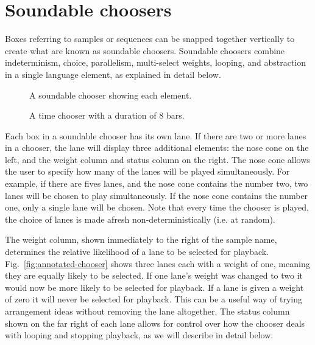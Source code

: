 \documentclass[runningheads,a4paper]{llncs}
\begin{document}
\section{Soundable choosers}\label{choosers}

Boxes referring to samples or sequences can be snapped together vertically to create what are known as soundable choosers. Soundable choosers combine indeterminism, choice, parallelism, multi-select weights, looping, and abstraction in a single language element, as explained in detail below.

\begin{figure}
	\begin{floatrow}
	{\caption{A soundable chooser showing each
		element.}\label{fig:annotated-chooser}}
	{\caption{A time chooser with a duration of 8
		bars.}\label{fig:time-chooser}}
	\end{floatrow}
\end{figure}


Each box in a soundable chooser has its own lane. If there are two or more lanes in a chooser, the lane will display three additional elements: the nose cone on the left, and the weight column and status column on the right. The nose cone allows the user to specify how many of the lanes will be played simultaneously. For example, if there are fives lanes, and the nose cone contains the number two, two lanes will be chosen to play simultaneously.  If the nose cone contains the number one, only a single lane will be chosen. Note that every time the chooser is played, the choice of lanes is made afresh non-deterministically (i.e. at random).
 
The weight column, shown immediately to the right of the sample name, determines the relative likelihood of a lane to be selected for playback. Fig.~\ref{fig:annotated-chooser} shows three lanes each with a weight of one, meaning they are equally likely to be selected. If one lane's weight was changed to two it would now be more likely to be selected for playback. If a lane is given a weight of zero it will never be selected for playback. This can be a useful way of trying arrangement ideas without removing the lane altogether. The status column shown on the far right of each lane allows for control over how the chooser deals with looping and stopping playback, as we will describe in detail below. 
 
\end{document}
